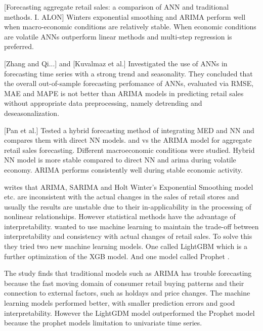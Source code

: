 [Forecasting aggregate retail sales: a comparison of ANN and traditional methods. I. ALON]
Winters exponential smoothing and ARIMA perform well when macro-economic
conditions are relatively stable. When economic conditions are volatile
ANNs outperform linear methods and multi-step regression is preferred.

[Zhang and Qi...] and [Kuvalmaz et al.]
Investigated the use of ANNs in forecasting time series with a strong trend and seasonality.
They concluded that the overall out-of-sample forecasting perfomance of ANNs, 
evaluated via RMSE, MAE and MAPE is not better than ARIMA models in predicting
retail sales without appropriate data preprocessing,
namely detrending and deseasonalization.

[Pan et al.]
Tested a hybrid forecasting method of integrating MED and NN and compares them with direct NN models.
and vs the ARIMA model for aggregate retail sales forecasting.
Different macroeconomic conditions were studied.
Hybrid NN model is more stable compared to direct NN and arima during volatile economy.
ARIMA performs consistently well during stable economic activity.


\cite{Weng2020} writes that ARIMA, SARIMA and Holt Winter's
Exponential Smoothing model etc. are inconsistent with the actual changes in the sales
of retail stores and usually the results are unstable due to their in-applicability
in the processing of nonlinear relationships.
However statistical methods have the advantage of interpretability.
\cite{Bowen2020} wanted to use machine learning to maintain
the trade-off between interpretability and consistency with actual
changes of retail sales.
To solve this they tried two new machine learning models.
One called LightGBM which is a further optimization of the XGB model.
And one model called Prophet \citep{Zunic2020}.

The study finds that traditional models such as ARIMA has trouble forecasting
because the fast moving domain of consumer retail buying patterns and 
their connection to external factors, such as holdays and price changes.
The machine learning models performed better, with smaller prediction errors
and good interpretability.
However the LightGDM model outperformed the Prophet model because the prophet
models limitation to univariate time series.

